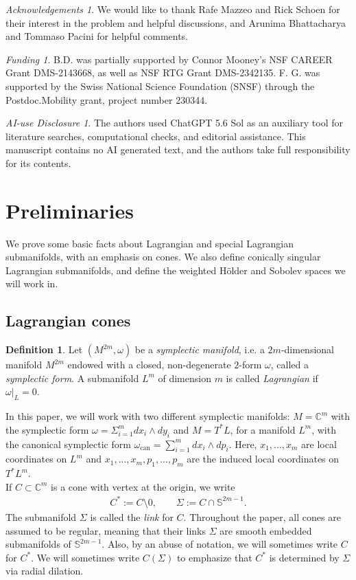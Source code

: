 \documentclass[11pt]{amsart}
\theoremstyle{definition}
\newtheorem{definition}{Definition}
\theoremstyle{remark}
\newtheorem*{ack*}{Acknowledgements}
\newtheorem*{fund*}{Funding}
\newtheorem*{ai*}{AI-use Disclosure}
\newcommand{\C}{\mathbb{C}}
\begin{document}
\begin{ack*} 
We would like to thank Rafe Mazzeo and Rick Schoen for their interest in the problem and helpful discussions, and Arunima Bhattacharya and Tommaso Pacini for helpful comments. 
\end{ack*}

\begin{fund*}
    B.D. was partially supported by Connor Mooney's NSF CAREER Grant DMS-2143668, as well as NSF RTG Grant DMS-2342135. F. G. was supported by the Swiss National Science Foundation (SNSF)
through the Postdoc.Mobility grant, project number 230344.
\end{fund*}

\begin{ai*}
    The authors used ChatGPT 5.6 Sol as an auxiliary tool for literature searches, computational checks, and editorial assistance. This manuscript contains no AI generated text, and the authors take full responsibility for its contents.
\end{ai*}

\section{Preliminaries}
We prove some basic facts about Lagrangian and special Lagrangian submanifolds, with an emphasis on cones. We also define conically singular Lagrangian submanifolds, and define the weighted H\"older and Sobolev spaces we will work in.
\subsection{Lagrangian cones}
\begin{definition}
    Let $(M^{2m},\omega)$ be a \emph{symplectic manifold}, i.e. a $2m$-dimensional manifold $M^{2m}$ endowed with a closed, non-degenerate $2$-form $\omega$, called a \emph{symplectic form}. A submanifold $L^m$ of dimension $m$ is called \emph{Lagrangian} if $\omega\vert_L=0$.
\end{definition}
In this paper, we will work with two different symplectic manifolds: $M=\C^m$ with the symplectic form $\omega=\Sigma_{i=1}^m dx_i\wedge dy_i$ and $M=T^\ast L$, for a manifold $L^m$, with the canonical symplectic form $\omega_{\text{can}}=\sum_{i=1}^m dx_i\wedge dp_i$. Here, $x_1,...,x_m$ are local coordinates on $L^m$ and $x_1,...,x_m,p_1,...,p_m$ are the induced local coordinates on $T^\ast L^m$.\\
If $C\subset \mathbb C^m$ is a cone with vertex at the origin, we write
\begin{align*}
C^\ast:=C\setminus{0}, \qquad \Sigma:=C\cap \mathbb{S}^{2m-1}.
\end{align*}
The submanifold $\Sigma$ is called the \emph{link} for $C$. Throughout the paper, all cones are assumed to be regular, meaning that their links $\Sigma$ are smooth embedded submanifolds of $\mathbb{S}^{2m-1}$. Also, by an abuse of notation, we will sometimes write $C$ for $C^\ast$. We will sometimes write $C(\Sigma)$ to emphasize that $C^\ast$ is determined by $\Sigma$ via radial dilation.
\end{document}
